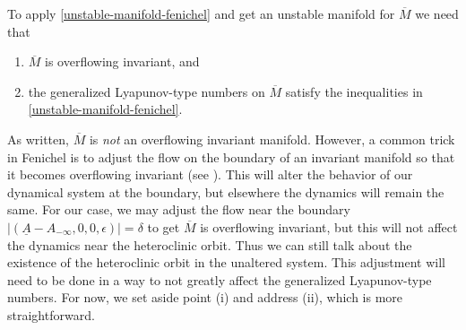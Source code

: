 To apply \cref{unstable-manifold-fenichel} and get an unstable manifold for \(\overline M\) we need that 
\begin{enumerate}[label=(\roman*)]
	\item \(\overline M\) is overflowing invariant, and 
	\item the generalized Lyapunov-type numbers on \(\overline M\) satisfy the inequalities in \cref{unstable-manifold-fenichel}.
\end{enumerate}
As written, \(\overline M\) is \emph{not} an overflowing invariant manifold. However, a common trick in Fenichel is to adjust the flow on the boundary of an invariant manifold so that it becomes overflowing invariant (see \cite[\S 6.3]{wiggins1994normally}). This will alter the behavior of our dynamical system at the boundary, but elsewhere the dynamics will remain the same. For our case, we may adjust the flow near the boundary \(|(\underline A - A_{-\infty}, 0, 0,  \epsilon)| = \delta\) to get \(\overline M\) is overflowing invariant, but this will not affect the dynamics near the heteroclinic orbit. Thus we can still talk about the existence of the heteroclinic orbit in the unaltered system. This adjustment will need to be done in a way to not greatly affect the generalized Lyapunov-type numbers. For now, we set aside point (i) and address (ii), which is more straightforward. 


